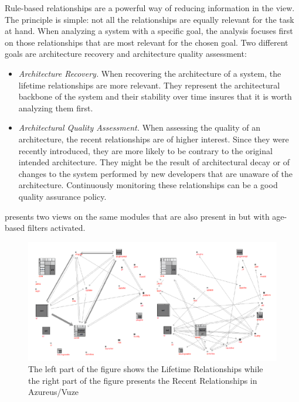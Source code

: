 \documentclass[preprint,12pt]{elsarticle}
\begin{document}
Rule-based relationships are a powerful way of reducing information in the view. The principle is simple: not all the relationships are equally relevant for the task at hand. When analyzing a system with a specific goal, the analysis focuses first on those relationships that are most relevant for the chosen goal. Two different goals are architecture recovery and architecture quality assessment: 

\begin{itemize}

\item {\em Architecture Recovery.} When recovering the architecture of a system, the lifetime relationships are more relevant. They represent the architectural backbone of the system and their stability over time insures that it is worth analyzing them first.

\item {\em Architectural Quality Assessment.} When assessing the quality of an architecture, the recent relationships are of higher interest. Since they were recently introduced, they are more likely to be contrary to the original intended architecture. They might be the result of architectural decay or of changes to the system performed by new developers that are unaware of the architecture. Continuously monitoring these relationships can be a good quality assurance policy.
\end{itemize}



 presents two views on the same modules that are also present in  but with age-based filters activated. 

\begin{figure}[ht]
\begin{center}
\includegraphics[width=\linewidth]{Architecture-LifetimeVsRecent}
\caption{The left part of the figure shows the Lifetime Relationships while the right part of the figure presents the Recent Relationships in Azureus/Vuze}
\end{center}
\end{figure}
\end{document}
